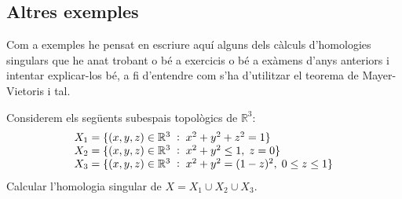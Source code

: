 \documentclass[../main.tex]{subfiles}
\begin{document}
\subsection*{Altres exemples}

Com a exemples he pensat en escriure aquí alguns dels càlculs d'homologies singulars que he anat trobant o bé a exercicis o bé a exàmens d'anys anteriors i intentar explicar-los bé, a fi d'entendre com s'ha d'utilitzar el teorema de Mayer-Vietoris i tal.

\begin{exercici}
Considerem els següents subespais topològics de $\mathbb{R}^3$:
\begin{equation}
    \notag
    \begin{array}{ll}
        X_1 = \{(x,y,z)\in\mathbb{R}^3\;:\;x^2+y^2+z^2 = 1\}\\
        X_2 = \{(x,y,z)\in\mathbb{R}^3\;:\;x^2+y^2\leq 1,\;z=0\}\\
        X_3 = \{(x,y,z)\in\mathbb{R}^3\;:\;x^2+y^2 = (1-z)^2,\;0\leq z\leq 1\}
    \end{array}
\end{equation}
Calcular l'homologia singular de $X = X_1\cup X_2\cup X_3$.
\end{exercici}
\end{document}
